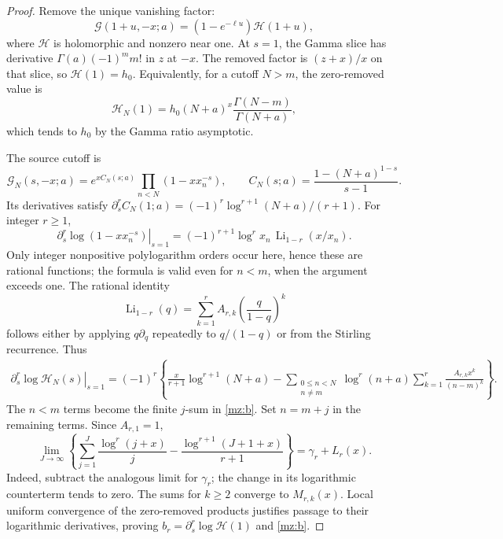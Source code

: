 \documentclass[11pt,letterpaper]{article}
\numberwithin{equation}{section}
\theoremstyle{plain}
\theoremstyle{definition}
\theoremstyle{remark}
\begin{document}
\begin{proof}
Remove the unique vanishing factor:
\[
 \mathcal G(1+u,-x;a)=(1-e^{-\ell u})\mathcal H(1+u),
\]
where $\mathcal H$ is holomorphic and nonzero near one. At $s=1$, the
Gamma slice has derivative $\Gamma(a)(-1)^m m!$ in $z$ at $-x$.
The removed factor is $(z+x)/x$ on that slice, so $\mathcal H(1)=h_0$.
Equivalently, for a cutoff $N>m$, the zero-removed value is
\begin{equation}
 \mathcal H_N(1)=h_0 (N+a)^x
                      \frac{\Gamma(N-m)}{\Gamma(N+a)},
 \label{mz:Hcut}
\end{equation}
which tends to $h_0$ by the Gamma ratio asymptotic.

The source cutoff is
\[
 \mathcal G_N(s,-x;a)
   =e^{xC_N(s;a)}\prod_{n<N}(1-xx_n^{-s}),\qquad
 C_N(s;a)=\frac{1-(N+a)^{1-s}}{s-1}.
\]
Its derivatives satisfy
$\partial_s^r C_N(1;a)=(-1)^r\log^{r+1}(N+a)/(r+1)$.
For integer $r\ge1$,
\begin{equation}
 \left.\partial_s^r\log(1-xx_n^{-s})\right|_{s=1}
       =(-1)^{r+1}\log^r x_n\,
                         \operatorname{Li}_{1-r}(x/x_n).
 \label{mz:LiDerivative}
\end{equation}
Only integer nonpositive polylogarithm orders occur here, hence these are
rational functions; the formula is valid even for $n<m$, when the
argument exceeds one. The rational identity
\begin{equation}
 \operatorname{Li}_{1-r}(q)
       =\sum_{k=1}^{r}A_{r,k}\left(\frac q{1-q}\right)^k
 \label{mz:LiStirling}
\end{equation}
follows either by applying $q\partial_q$ repeatedly to $q/(1-q)$ or
from the Stirling recurrence. Thus
\begin{align}
 \left.\partial_s^r\log\mathcal H_N(s)\right|_{s=1}
 =(-1)^r\left\{\frac{x}{r+1}\log^{r+1}(N+a)
  -\sum_{\substack{0\le n<N\\n\ne m}}\log^r(n+a)
          \sum_{k=1}^{r}\frac{A_{r,k}x^k}{(n-m)^k}\right\}.
 \label{mz:bcut}
\end{align}
The $n<m$ terms become the finite $j$-sum in \eqref{mz:b}. Set $n=m+j$
in the remaining terms. Since $A_{r,1}=1$,
\[
 \lim_{J\to\infty}\left\{
   \sum_{j=1}^{J}\frac{\log^r(j+x)}j
       -\frac{\log^{r+1}(J+1+x)}{r+1}\right\}
       =\gamma_r+L_r(x).
\]
Indeed, subtract the analogous limit for $\gamma_r$; the change in its
logarithmic counterterm tends to zero. The sums for $k\ge2$ converge to
$M_{r,k}(x)$. Local uniform convergence of the zero-removed products
justifies passage to their logarithmic derivatives, proving
$b_r=\partial_s^r\log\mathcal H(1)$ and \eqref{mz:b}.


\end{proof}
\end{document}

